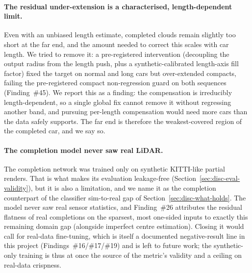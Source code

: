 \paragraph{The residual under-extension is a characterised, length-dependent limit.}
Even with an unbiased length estimate, completed clouds remain slightly too short at the
far end, and the amount needed to correct this scales with car length. We tried to remove
it: a pre-registered intervention (decoupling the output radius from the length push, plus
a synthetic-calibrated length-axis fill factor) fixed the target on normal and long cars
but over-extended compacts, failing the pre-registered compact non-regression guard on
both sequences (Finding~\#45). We report this as a finding: the compensation is
irreducibly length-dependent, so a single global fix cannot remove it without regressing
another band, and pursuing per-length compensation would need more cars than the data
safely supports. The far end is therefore the weakest-covered region of the completed car,
and we say so.

\paragraph{The completion model never saw real LiDAR.}
The completion network was trained only on synthetic KITTI-like partial renders. That is
what makes its evaluation leakage-free (Section~\ref{sec:disc-eval-validity}), but it is
also a limitation, and we name it as the completion counterpart of the classifier
sim-to-real gap of Section~\ref{sec:disc-what-holds}. The model never saw real sensor
statistics, and Finding~\#26 attributes the residual flatness of real completions on the
sparsest, most one-sided inputs to exactly this remaining domain gap (alongside imperfect
centre estimation). Closing it would call for real-data fine-tuning, which is itself a
documented negative-result line in this project (Findings~\#16/\#17/\#19) and is left to
future work; the synthetic-only training is thus at once the source of the metric's
validity and a ceiling on real-data crispness.

